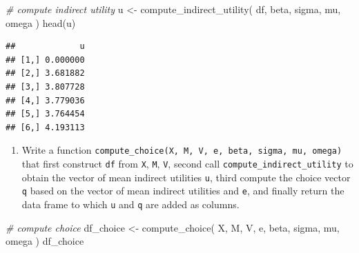 \documentclass[
]{book}
\newenvironment{Shaded}{\begin{snugshade}}{\end{snugshade}}
\newcommand{\CommentTok}[1]{\textcolor[rgb]{0.56,0.35,0.01}{\textit{#1}}}
\newcommand{\FunctionTok}[1]{\textcolor[rgb]{0.00,0.00,0.00}{#1}}
\newcommand{\NormalTok}[1]{#1}
\newcommand{\OtherTok}[1]{\textcolor[rgb]{0.56,0.35,0.01}{#1}}
\providecommand{\tightlist}{%
  \setlength{\itemsep}{0pt}\setlength{\parskip}{0pt}}
\begin{document}
\begin{Shaded}
\begin{Highlighting}[]
\CommentTok{\# compute indirect utility}
\NormalTok{u }\OtherTok{\textless{}{-}} 
  \FunctionTok{compute\_indirect\_utility}\NormalTok{(}
\NormalTok{    df, }
\NormalTok{    beta, }
\NormalTok{    sigma, }
\NormalTok{    mu, }
\NormalTok{    omega}
\NormalTok{    )}
\FunctionTok{head}\NormalTok{(u)}
\end{Highlighting}
\end{Shaded}

\begin{verbatim}
##             u
## [1,] 0.000000
## [2,] 3.681882
## [3,] 3.807728
## [4,] 3.779036
## [5,] 3.764454
## [6,] 4.193113
\end{verbatim}

\begin{enumerate}
\def\labelenumi{\arabic{enumi}.}
\setcounter{enumi}{7}
\tightlist
\item
  Write a function \texttt{compute\_choice(X,\ M,\ V,\ e,\ beta,\ sigma,\ mu,\ omega)} that first construct \texttt{df} from \texttt{X}, \texttt{M}, \texttt{V}, second call \texttt{compute\_indirect\_utility} to obtain the vector of mean indirect utilities \texttt{u}, third compute the choice vector \texttt{q} based on the vector of mean indirect utilities and \texttt{e}, and finally return the data frame to which \texttt{u} and \texttt{q} are added as columns.
\end{enumerate}

\begin{Shaded}
\begin{Highlighting}[]
\CommentTok{\# compute choice}
\NormalTok{df\_choice }\OtherTok{\textless{}{-}} 
  \FunctionTok{compute\_choice}\NormalTok{(}
\NormalTok{    X, }
\NormalTok{    M, }
\NormalTok{    V, }
\NormalTok{    e, }
\NormalTok{    beta, }
\NormalTok{    sigma, }
\NormalTok{    mu, }
\NormalTok{    omega}
\NormalTok{    )}
\NormalTok{df\_choice}
\end{Highlighting}
\end{Shaded}
\end{document}

